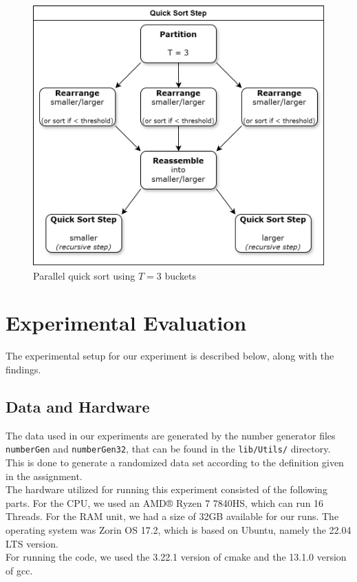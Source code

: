 \documentclass[twocolumn]{article}
\begin{document}
\begin{figure}[h]
    \includegraphics[scale=0.175]{./figures/parallel_quick_sort.png}
    \centering
    \caption{Parallel quick sort using $T=3$ buckets}
\end{figure}

\section{Experimental Evaluation}
The experimental setup for our experiment is described below, along with the findings.

\subsection{Data and Hardware}%
\label{sub:Data and Hardware}
The data used in our experiments are generated by the number generator files \texttt{numberGen} and \texttt{numberGen32}, that can be found in the \texttt{lib/Utils/} directory. This is done to generate a randomized data set according to the definition given in the assignment.\\
The hardware utilized for running this experiment consisted of the following parts. For the CPU, we used an AMD® Ryzen 7 7840HS, which can run 16 Threads. For the RAM unit, we had a size of 32GB available for our runs. The operating system was Zorin OS 17.2, which is based on Ubuntu, namely the 22.04 LTS version.\\
For running the code, we used the 3.22.1 version of cmake and the 13.1.0 version of gcc.
\end{document}
